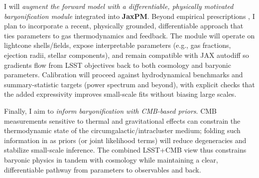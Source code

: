 \documentclass{article}
\begin{document}
I will \emph{augment the forward model with a differentiable, physically motivated baryonification module} integrated into \textbf{JaxPM}. Beyond empirical prescriptions \citep{Schneider2015Baryonification}, I plan to incorporate a recent, physically grounded, differentiable approach \citep{PhysBaryon2025} that ties parameters to gas thermodynamics and feedback. The module will operate on lightcone shells/fields, expose interpretable parameters (e.g., gas fractions, ejection radii, stellar components), and remain compatible with JAX autodiff so gradients flow from LSST objectives back to both cosmology and baryonic parameters. Calibration will proceed against hydrodynamical benchmarks and summary-statistic targets (power spectrum and beyond), with explicit checks that the added expressivity improves small-scale fits without biasing large scales.

Finally, I aim to \emph{inform baryonification with CMB-based priors}. CMB measurements sensitive to thermal and gravitational effects can constrain the thermodynamic state of the circumgalactic/intracluster medium; folding such information in as priors (or joint likelihood terms) will reduce degeneracies and stabilize small-scale inference. The combined LSST+CMB view thus constrains baryonic physics in tandem with cosmology while maintaining a clear, differentiable pathway from parameters to observables and back.



\end{document}
